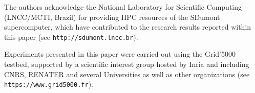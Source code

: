 \documentclass[a4paper, 10pt, twocolumn, final]{article}  %
\begin{document}
The authors acknowledge the National Laboratory for Scientific Computing (LNCC/MCTI, Brazil) for providing HPC resources of the SDumont supercomputer, which have contributed to the research results reported within this paper (see \texttt{http://sdumont.lncc.br}).

Experiments presented in this paper were carried out using the Grid'5000 testbed, supported by a scientific interest group hosted by Inria and including CNRS, RENATER and several Universities as well as other organizations (see \texttt{https://www.grid5000.fr}).



\end{document}
